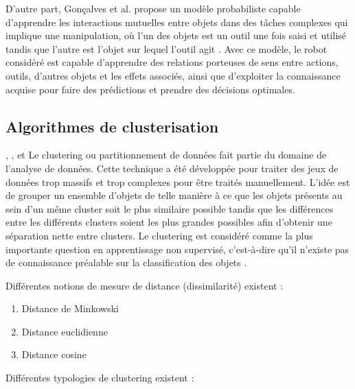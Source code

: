 \documentclass[draft]{llncs}
\begin{document}
D'autre part, Gonçalves et al. \cite{Goncalves2014} propose un modèle probabiliste capable d'apprendre les interactions mutuelles entre objets dans des tâches complexes qui implique une manipulation, où l'un des objets est un outil une fois saisi et utilisé tandis que l'autre est l'objet sur lequel l'outil agit . Avec ce modèle, le robot considéré est capable d'apprendre des relations porteuses de sens entre actions, outils, d'autres objets et les effets associés, ainsi que d'exploiter la connaissance acquise pour faire des prédictions et prendre des décisions optimales.




\subsection{Algorithmes de clusterisation}

\cite{Xu2015}, \cite{Andreopoulos2009}, \cite{Fahad2014} \cite{Tan2005} et \cite{Sajana2016}
Le clustering ou partitionnement de données fait partie du domaine de l'analyse de données.
Cette technique a été développée pour traiter des jeux de données trop massifs et trop complexes pour être traités manuellement.
L'idée est de grouper un ensemble d'objets de telle manière à ce que les objets présents au sein d'un même cluster soit le plus similaire possible tandis que les différences entre les différents clusters soient les plus grandes possibles afin d'obtenir une séparation nette entre clusters.
Le clustering est considéré comme la plus importante question en apprentissage non supervisé, c'est-à-dire qu'il n'existe pas de connaissance préalable sur la classification des objets \cite{Xu2015}.

Différentes notions de mesure de distance (dissimilarité) existent :

\begin{enumerate}
  \item Distance de Minkowski
  \item Distance euclidienne
  \item Distance cosine
\end{enumerate}

Différentes typologies de clustering existent : 
\end{document}
